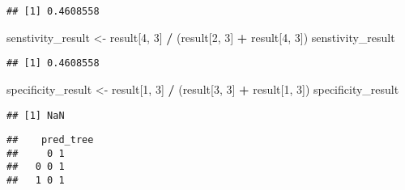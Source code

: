 \documentclass[]{article}
\newenvironment{Shaded}{\begin{snugshade}}{\end{snugshade}}
\newcommand{\KeywordTok}[1]{\textcolor[rgb]{0.13,0.29,0.53}{\textbf{#1}}}
\newcommand{\DecValTok}[1]{\textcolor[rgb]{0.00,0.00,0.81}{#1}}
\newcommand{\StringTok}[1]{\textcolor[rgb]{0.31,0.60,0.02}{#1}}
\newcommand{\OperatorTok}[1]{\textcolor[rgb]{0.81,0.36,0.00}{\textbf{#1}}}
\newcommand{\NormalTok}[1]{#1}
\begin{document}
\begin{verbatim}
## [1] 0.4608558
\end{verbatim}

\begin{Shaded}
\begin{Highlighting}[]
\NormalTok{senstivity_result <-}\StringTok{ }\NormalTok{result[}\DecValTok{4}\NormalTok{, }\DecValTok{3}\NormalTok{] }\OperatorTok{/}\StringTok{ }\NormalTok{(result[}\DecValTok{2}\NormalTok{, }\DecValTok{3}\NormalTok{] }\OperatorTok{+}\StringTok{ }\NormalTok{result[}\DecValTok{4}\NormalTok{, }\DecValTok{3}\NormalTok{])}
\NormalTok{senstivity_result}
\end{Highlighting}
\end{Shaded}

\begin{verbatim}
## [1] 0.4608558
\end{verbatim}

\begin{Shaded}
\begin{Highlighting}[]
\NormalTok{specificity_result <-}\StringTok{ }\NormalTok{result[}\DecValTok{1}\NormalTok{, }\DecValTok{3}\NormalTok{] }\OperatorTok{/}\StringTok{ }\NormalTok{(result[}\DecValTok{3}\NormalTok{, }\DecValTok{3}\NormalTok{] }\OperatorTok{+}\StringTok{ }\NormalTok{result[}\DecValTok{1}\NormalTok{, }\DecValTok{3}\NormalTok{])}
\NormalTok{specificity_result}
\end{Highlighting}
\end{Shaded}

\begin{verbatim}
## [1] NaN
\end{verbatim}

\begin{Shaded}
\end{Shaded}

\begin{verbatim}
##    pred_tree
##     0 1
##   0 0 1
##   1 0 1
\end{verbatim}
\end{document}
